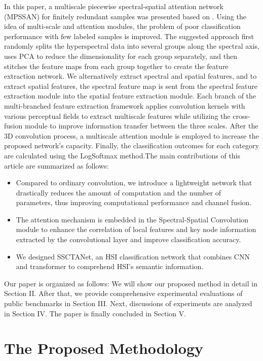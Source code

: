 \documentclass[]{interact}
\theoremstyle{plain}%
\theoremstyle{definition}
\theoremstyle{remark}
\begin{document}
In this paper, a multiscale piecewise spectral-spatial attention network (MPSSAN) for finitely redundant samples was presented based on \citep{ghaderizadeh2022multiscale,woo2018cbam,2021Feature}. Using the idea of multi-scale and attention modules, the problem of poor classification performance with few labeled samples is improved. The suggested approach first randomly splits the hyperspectral data into several groups along the spectral axis, uses PCA to reduce the dimensionality for each group separately, and then stitches the feature maps from each group together to create the feature extraction network. We alternatively extract spectral and spatial features, and to extract spatial features, the spectral feature map is sent from the spectral feature extraction module into the spatial feature extraction module. Each branch of the multi-branched feature extraction framework applies convolution kernels with various perceptual fields to extract multiscale features while utilizing the cross-fusion module to improve information transfer between the three scales. After the 3D convolution process, a multiscale attention module is employed to increase the proposed network's capacity. Finally, the classification outcomes for each category are calculated using the LogSoftmax method.The main contributions of this article are summarized as follows:

\begin{itemize}
\item Compared to ordinary convolution, we introduce a lightweight network that drastically reduces the amount of computation and the number of parameters, thus improving computational performance and channel fusion.
\item The attention mechanism is embedded in the Spectral-Spatial Convolution module to enhance the correlation of local features and key node information extracted by the convolutional layer and improve classification accuracy.
\item We designed SSCTANet, an HSI classification network that combines CNN and transformer to comprehend HSI's semantic information.
\end{itemize}


Our paper is organized as follows: We will show our proposed method in detail in Section II. After that, we provide comprehensive experimental evaluations of public benchmarks in Section III. Next, discussions of experiments are analyzed in Section IV. The paper is finally concluded in Section V.

\section{The Proposed Methodology}
\end{document}
